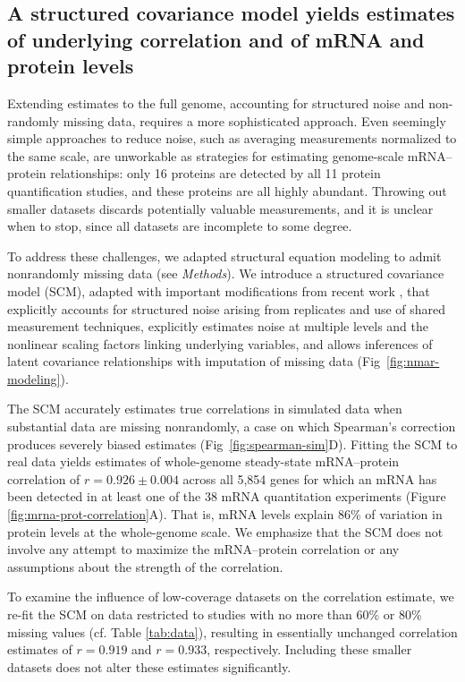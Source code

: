 \documentclass[10pt]{article}
\begin{document}
\subsection*{A structured covariance model yields estimates of underlying correlation and of mRNA and protein levels}

Extending estimates to the full genome, accounting for structured noise and
non-randomly missing data, requires a more sophisticated approach. Even
seemingly simple approaches to reduce noise, such as averaging measurements
normalized to the same scale, are unworkable as strategies for estimating genome-scale 
mRNA--protein relationships: only 16 proteins are detected by
all 11 protein quantification studies, and these proteins are all highly
abundant. Throwing out smaller datasets discards potentially valuable
measurements, and it is unclear when to stop, since all datasets are
incomplete to some degree.

To address these challenges, we adapted structural equation modeling to admit
nonrandomly missing data (see \emph{Methods}). We introduce a structured
covariance model (SCM), adapted with important modifications from recent work
\cite{Franks2014}, that explicitly accounts for structured noise arising from
replicates and use of shared measurement techniques, explicitly estimates
noise at multiple levels and the nonlinear scaling factors linking underlying
variables, and allows inferences of latent covariance relationships with
imputation of missing data (Fig~\ref{fig:nmar-modeling}).

The SCM accurately estimates true correlations in simulated data when
substantial data are missing nonrandomly, a case on which Spearman's
correction produces severely biased estimates
(Fig~\ref{fig:spearman-sim}D).  Fitting the SCM to real data
yields estimates of whole-genome steady-state mRNA--protein
correlation of \(r=0.926 \pm 0.004\)
across all 5,854 genes for which an mRNA has been detected
in at least one of the 38 mRNA quantitation experiments (Figure
\ref{fig:mrna-prot-correlation}A). That is, mRNA levels explain 86\% of
variation in protein levels at the whole-genome scale. We emphasize
that the SCM does not involve any attempt to maximize the
mRNA--protein correlation or any assumptions about the strength of the
correlation.

To examine the influence of low-coverage datasets on the correlation estimate, we re-fit the SCM on data restricted to studies with no more than 60\% or 80\% missing values (cf. Table \ref{tab:data}), resulting in essentially unchanged correlation estimates of $r=0.919$ and $r=0.933$, respectively. Including these smaller datasets does not alter these estimates significantly.
\end{document}
